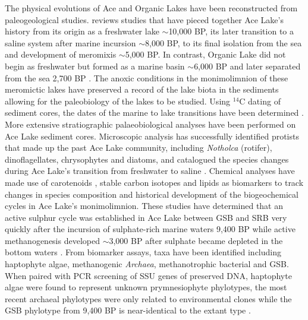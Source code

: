 The physical evolutions of Ace and Organic Lakes have been reconstructed from paleogeological studies.
\citet{Rankin1999} reviews studies that have pieced together Ace Lake's history from its origin as a freshwater lake $\sim$10,000 BP, its later transition to a saline system after marine incursion $\sim$8,000 BP, to its final isolation from the sea and development of meromixis $\sim$5,000 BP.
In contrast, Organic Lake did not begin as freshwater but formed as a marine basin $\sim$6,000 BP and later separated from the sea 2,700 BP \cite{Bird1991, Zwartz1998}.
The anoxic conditions in the monimolimnion of these meromictic lakes have preserved a record of the lake biota in the sediments allowing for the paleobiology of the lakes to be studied.
Using $^{14}$C dating of sediment cores, the dates of the marine to lake transitions have been determined \cite{Bird1991}.
More extensive stratiographic palaeobiological analyses have been performed on Ace Lake sediment cores.
Microscopic analysis has successfully identified protists that made up the past Ace Lake community, including \emph{Notholca} (rotifer), dinoflagellates, chrysophytes and diatoms, and catalogued the species changes during Ace Lake's transition from freshwater to saline \cite{Roberts1999, Swadling2001}.
Chemical analyses have made use of carotenoids \cite{Hopmans2005, Coolen2006}, stable carbon isotopes \cite{Schouten2001} and lipids \cite{Volkman1986, Volkman1988, Damste2001, Coolen2004a, Coolen2004b} as biomarkers to track changes in species composition and historical development of the biogeochemical cycles in Ace Lake's monimolimnion.
These studies have determined that an active sulphur cycle was established in Ace Lake between \ac{GSB} and \ac{SRB} very quickly after the incursion of sulphate-rich marine waters 9,400 BP while active methanogenesis developed $\sim$3,000 BP after sulphate became depleted in the bottom waters \cite{Coolen2004b, Coolen2006}.
From biomarker assays, taxa have been identified including haptophyte algae, methanogenic \emph{Archaea}, methanotrophic bacterial and \ac{GSB}.
When paired with \ac{PCR} screening of \ac{SSU} genes of preserved \textsc{DNA}, haptophyte algae were found to represent unknown prymnesiophyte phylotypes, the most recent archaeal phylotypes were only related to environmental clones while the \ac{GSB} phylotype from 9,400 BP is near-identical to the extant type \cite{Coolen2004a, Coolen2004b, Coolen2006}.

